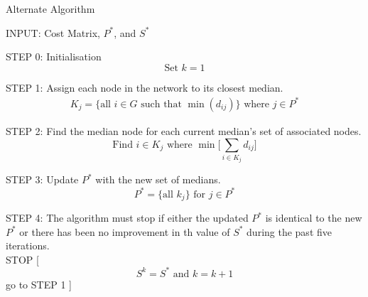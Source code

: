 \documentclass[11pt]{article}
\begin{document}
\begin{algorithm}
	\caption{Alternate Algorithm}
	\begin{algorithmic}[0]
		\Statex 
		\Statex INPUT: Cost Matrix, $P^*$, and $S^*$
		
		\Statex 
		\Statex STEP 0: Initialisation
		\Statex 
		\begin{equation*}
		\text{Set } k = 1
		\end{equation*}
		
		\Statex 
		\Statex STEP 1: Assign each node in the network to its closest median.
		\begin{align*}
		K_j=\{\text{all } i \in G \text{ such that }\min (d_{ij})\} \text{ where } j \in P^*
		\end{align*}
		
		\Statex 
		\Statex STEP 2: Find the median node for each current median's set of associated nodes.
		\begin{equation*}
		\text{Find } i \in K_j \text{ where } \min \bigg[ \sum_{i\in K_j} d_{ij} \bigg] 
		\end{equation*}

		
		\Statex 
		\Statex STEP 3: Update $P^*$ with the new set of medians.
		\begin{equation*}
		P^{*} = \{\text{all } k_j  \} \text{ for } j \in P^*
		\end{equation*}
		
		\Statex 
		\Statex STEP 4: The algorithm must stop if either the updated $P^*$ is identical to the new $P^*$ or there has been no improvement in th value of $S^*$ during the past five iterations.\\
		
		\Statex STOP
		[
		\Else
		\begin{equation*}
		S^k = S^* \text{ and } k = k+1
		\end{equation*}
		\Statex go to STEP 1
		]
		\EndIf
				
	\end{algorithmic}
\end{algorithm}
		
		
\end{document}
